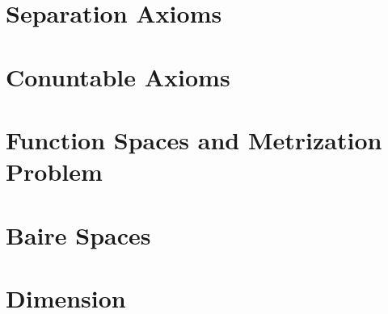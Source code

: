 \documentclass[Total.tex]{subfiles}
\begin{document}
	\chapter{Separation Axioms}
	
	\chapter{Conuntable Axioms}
	
	\chapter{Function Spaces and Metrization Problem}
	
	\chapter{Baire Spaces}
	
	\chapter{Dimension}
		
\end{document}
